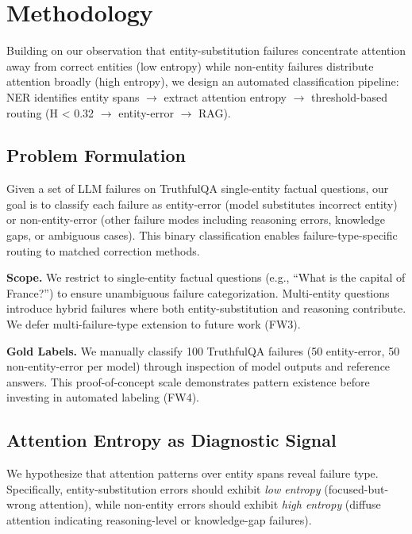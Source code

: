 \section{Methodology}
\label{sec:methodology}

Building on our observation that entity-substitution failures concentrate attention away from correct entities (low entropy) while non-entity failures distribute attention broadly (high entropy), we design an automated classification pipeline: NER identifies entity spans $\to$ extract attention entropy $\to$ threshold-based routing (H < 0.32 $\to$ entity-error $\to$ RAG).

\subsection{Problem Formulation}

Given a set of LLM failures on TruthfulQA single-entity factual questions, our goal is to classify each failure as entity-error (model substitutes incorrect entity) or non-entity-error (other failure modes including reasoning errors, knowledge gaps, or ambiguous cases). This binary classification enables failure-type-specific routing to matched correction methods.

\textbf{Scope.} We restrict to single-entity factual questions (e.g., ``What is the capital of France?'') to ensure unambiguous failure categorization. Multi-entity questions introduce hybrid failures where both entity-substitution and reasoning contribute. We defer multi-failure-type extension to future work (FW3).

\textbf{Gold Labels.} We manually classify 100 TruthfulQA failures (50 entity-error, 50 non-entity-error per model) through inspection of model outputs and reference answers. This proof-of-concept scale demonstrates pattern existence before investing in automated labeling (FW4).

\subsection{Attention Entropy as Diagnostic Signal}

We hypothesize that attention patterns over entity spans reveal failure type. Specifically, entity-substitution errors should exhibit \textit{low entropy} (focused-but-wrong attention), while non-entity errors should exhibit \textit{high entropy} (diffuse attention indicating reasoning-level or knowledge-gap failures).

